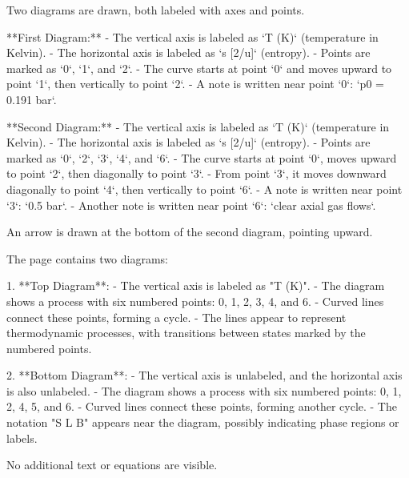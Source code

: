 Two diagrams are drawn, both labeled with axes and points.  

**First Diagram:**  
- The vertical axis is labeled as `T (K)` (temperature in Kelvin).  
- The horizontal axis is labeled as `s [2/u]` (entropy).  
- Points are marked as `0`, `1`, and `2`.  
- The curve starts at point `0` and moves upward to point `1`, then vertically to point `2`.  
- A note is written near point `0`: `p0 = 0.191 bar`.  

**Second Diagram:**  
- The vertical axis is labeled as `T (K)` (temperature in Kelvin).  
- The horizontal axis is labeled as `s [2/u]` (entropy).  
- Points are marked as `0`, `2`, `3`, `4`, and `6`.  
- The curve starts at point `0`, moves upward to point `2`, then diagonally to point `3`.  
- From point `3`, it moves downward diagonally to point `4`, then vertically to point `6`.  
- A note is written near point `3`: `0.5 bar`.  
- Another note is written near point `6`: `clear axial gas flows`.  

An arrow is drawn at the bottom of the second diagram, pointing upward.

The page contains two diagrams:

1. **Top Diagram**:
   - The vertical axis is labeled as "T (K)".
   - The diagram shows a process with six numbered points: 0, 1, 2, 3, 4, and 6.
   - Curved lines connect these points, forming a cycle.
   - The lines appear to represent thermodynamic processes, with transitions between states marked by the numbered points.

2. **Bottom Diagram**:
   - The vertical axis is unlabeled, and the horizontal axis is also unlabeled.
   - The diagram shows a process with six numbered points: 0, 1, 2, 4, 5, and 6.
   - Curved lines connect these points, forming another cycle.
   - The notation "S L B" appears near the diagram, possibly indicating phase regions or labels.

No additional text or equations are visible.